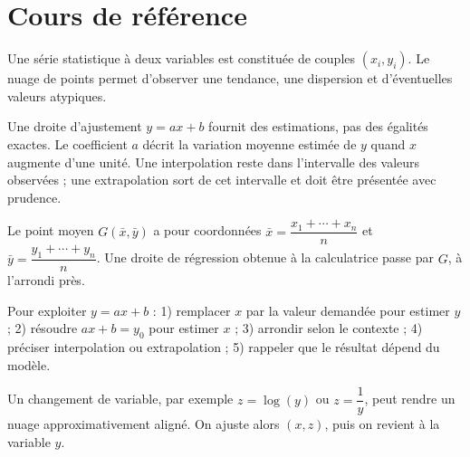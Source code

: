 
\section{Cours de référence}
Une série statistique à deux variables est constituée de couples $(x_i,y_i)$. Le nuage de points permet d'observer une tendance, une dispersion et d'éventuelles valeurs atypiques.

\begin{center}
\end{center}

\begin{keypoint}
Une droite d'ajustement $y=ax+b$ fournit des estimations, pas des égalités exactes. Le coefficient $a$ décrit la variation moyenne estimée de $y$ quand $x$ augmente d'une unité. Une interpolation reste dans l'intervalle des valeurs observées ; une extrapolation sort de cet intervalle et doit être présentée avec prudence.
\end{keypoint}

Le point moyen $G(\bar x,\bar y)$ a pour coordonnées $\bar x=\dfrac{x_1+\cdots+x_n}{n}$ et $\bar y=\dfrac{y_1+\cdots+y_n}{n}$. Une droite de régression obtenue à la calculatrice passe par $G$, à l'arrondi près.

\begin{method}
Pour exploiter $y=ax+b$ : 1) remplacer $x$ par la valeur demandée pour estimer $y$ ; 2) résoudre $ax+b=y_0$ pour estimer $x$ ; 3) arrondir selon le contexte ; 4) préciser interpolation ou extrapolation ; 5) rappeler que le résultat dépend du modèle.
\end{method}

Un changement de variable, par exemple $z=\log(y)$ ou $z=\dfrac1y$, peut rendre un nuage approximativement aligné. On ajuste alors $(x,z)$, puis on revient à la variable $y$.

